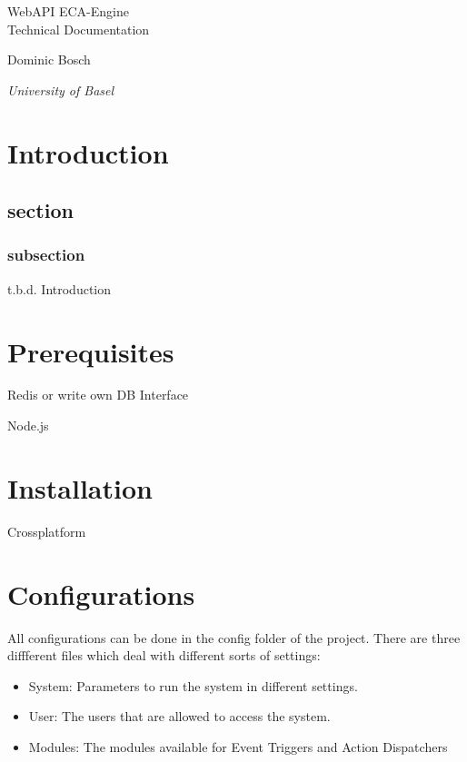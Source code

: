 \documentclass{article}
\newcommand*{\createTitlePage}{\begingroup
\centering
\vspace*{6\baselineskip}

{\Huge WebAPI ECA-Engine}\\[4\baselineskip]

{\LARGE Technical Documentation} \\[\baselineskip]

\vspace*{25\baselineskip}

{Dominic Bosch\par}
{\itshape University of Basel\par}




\endgroup}
\begin{document}
\clearpage\createTitlePage
\thispagestyle{empty}

\newpage
\tableofcontents
\newpage


\section{Introduction}
\subsection{section}
\subsubsection{subsection}
t.b.d.
Introduction


\section{Prerequisites}
Redis or write own DB Interface

Node.js

\section{Installation}
Crossplatform

\section{Configurations}
	All configurations can be done in the config folder of the project. There are three diffferent files which deal with different sorts of settings:
	\begin{itemize}
	  \item System: Parameters to run the system in different settings.
	  \item User: The users that are allowed to access the system.
	  \item Modules: The modules available for Event Triggers and Action Dispatchers
	\end{itemize}
\end{document}
